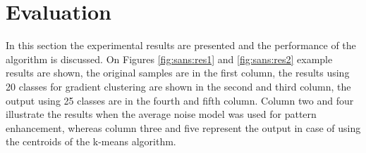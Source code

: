 \documentclass[draft,final]{vutinfth} %
\begin{document}
\section{Evaluation}
\par
In this section the experimental results are presented and the performance of the algorithm is discussed.
On Figures \ref{fig:sans:res1} and \ref{fig:sans:res2} example results are shown, the original samples are in the first column, the results using 20 classes for gradient clustering are shown in the second and third column, the output using 25 classes are in the fourth and fifth column.
Column two and four illustrate the results when the average noise model was used for pattern enhancement, whereas column three and five represent the output in case of using the centroids of the k-means algorithm.
\end{document}
